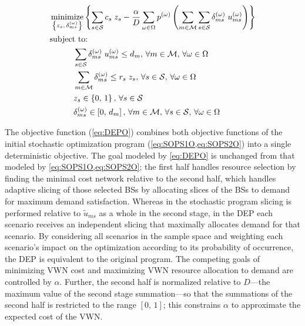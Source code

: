 \documentclass[12pt,dvipsnames]{report}
\DeclareMathOperator*{\argmin}{minimize}
\begin{document}
\begin{tcolorbox}[floatplacement = !ht, float, title = Deterministic Equivalent Program (DEP) of \Cref{eq:SOPS1O,eq:SOPS1C1,eq:SOPS2O,eq:SOPS2C1,eq:SOPS2C2,eq:SOPS2C3,eq:SOPS2C4}]
\begin{align}
& \argmin_{\left\{ z_s,\, \delta_{ms}^{\left( \omega \right)} \right\}} \left\{ \sum_{s \in \mathcal{S}} c_s \; z_s - \frac{\alpha}{D} \sum_{\omega \in \Omega} p^{\left( \omega \right)} \left( \sum_{m \in \mathcal{M}} \sum_{s \in \mathcal{S}} \delta_{ms}^{\left( \omega \right)} \; u_{ms}^{\left( \omega \right)} \right) \right\} \label{eq:DEPO}\\
& \text{subject to:} \nonumber \\
& \hspace{0.4in} \sum_{s \in \mathcal{S}} \delta_{ms}^{\left( \omega \right)} \; u_{ms}^{\left( \omega \right)} \leq d_m,\, \forall m \in \mathcal{M},\, \forall \omega \in \Omega \label{eq:DEPC1}\\
& \hspace{0.4in} \sum_{m \in \mathcal{M}} \delta_{ms}^{\left( \omega \right)} \leq r_s \; z_s,\, \forall s \in \mathcal{S},\, \forall \omega \in \Omega \label{eq:DEPC2}\\
& \hspace{0.4in} z_s \in \left\{ 0,\, 1 \right\},\, \forall s \in \mathcal{S} \label{eq:DEPC3}\\
& \hspace{0.4in} \delta_{ms}^{\left( \omega \right)} \in \left[ 0,\, d_m \right],\, \forall m \in \mathcal{M},\, \forall s \in \mathcal{S},\, \forall \omega \in \Omega \label{eq:DEPC4}
\end{align}
\end{tcolorbox}

The objective function (\cref{eq:DEPO}) combines both objective functions of the initial stochastic optimization program (\cref{eq:SOPS1O,eq:SOPS2O}) into a single deterministic objective.  The goal modeled by \cref{eq:DEPO} is unchanged from that modeled by \cref{eq:SOPS1O,eq:SOPS2O}; the first half handles resource selection by finding the minimal cost network relative to the second half, which handles adaptive slicing of those selected BSs by allocating slices of the BSs to demand for maximum demand satisfaction.  Whereas in the stochastic program slicing is performed relative to $\tilde{u}_{ms}$ as a whole in the second stage, in the DEP each scenario receives an independent slicing that maximally allocates demand for that scenario.  By considering all scenarios in the sample space and weighting each scenario's impact on the optimization according to its probability of occurrence, the DEP is equivalent to the original program.  The competing goals of minimizing VWN cost and maximizing VWN resource allocation to demand are controlled by $\alpha$.  Further, the second half is normalized relative to $D$---the maximum value of the second stage summation---so that the summations of the second half is restricted to the range $\left[ 0,\, 1 \right]$; this constrains $\alpha$ to approximate the expected cost of the VWN.
\end{document}
